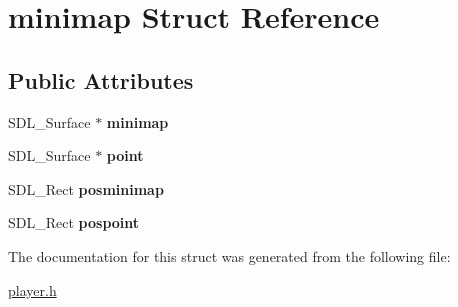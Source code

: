 \hypertarget{structminimap}{}\section{minimap Struct Reference}
\label{structminimap}
\subsection*{Public Attributes}
\begin{DoxyCompactItemize}
\item 
\mbox{\label{structminimap_a91f3511bf598b0975ad0cc6cef01e083}} 
S\+D\+L\+\_\+\+Surface $\ast$ {\bfseries minimap}
\item 
\mbox{\label{structminimap_afad51efa309fb915e5368966d6709d1f}} 
S\+D\+L\+\_\+\+Surface $\ast$ {\bfseries point}
\item 
\mbox{\label{structminimap_af89543cc1f2d0b187807e64dce3e9cf7}} 
S\+D\+L\+\_\+\+Rect {\bfseries posminimap}
\item 
\mbox{\label{structminimap_ae6326316194dec76865d486b998de3b2}} 
S\+D\+L\+\_\+\+Rect {\bfseries pospoint}
\end{DoxyCompactItemize}


The documentation for this struct was generated from the following file\+:\begin{DoxyCompactItemize}
\item 
\hyperlink{player_8h}{player.\+h}\end{DoxyCompactItemize}
